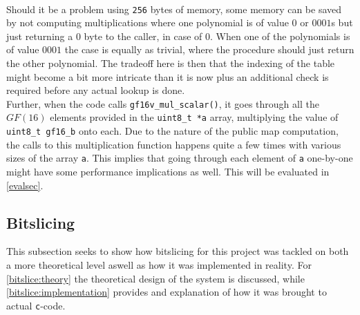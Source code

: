 \medskip\\
Should it be a problem using \texttt{256} bytes of memory, some memory can be saved by not computing multiplications where one polynomial is of value $0$ or $0001$s but just returning a $0$ byte to the caller, in case of $0$. When one of the polynomials is of value $0001$ the case is equally as trivial, where the procedure should just return the other polynomial. The tradeoff here is then that the indexing of the table might become a bit more intricate than it is now plus an additional check is required before any actual lookup is done.
\medskip\\
Further, when the code calls \texttt{gf16v\_mul\_scalar()}, it goes through all the $GF(16)$ elements provided in the \texttt{uint8\_t *a} array, multiplying the value of \texttt{uint8\_t gf16\_b} onto each. Due to the nature of the public map computation, the calls to this multiplication function happens quite a few times with various sizes of the array \texttt{a}. This implies that going through each element of \texttt{a} one-by-one might have some performance implications as well. This will be evaluated in \cref{evalsec}.
\subsection{Bitslicing} \label{opt:bitslice}
This subsection seeks to show how bitslicing for this project was tackled on both a more theoretical level aswell as how it was implemented in reality. For \cref{bitslice:theory} the theoretical design of the system is discussed, while \cref{bitslice:implementation} provides and explanation of how it was brought to actual \texttt{c}-code.
